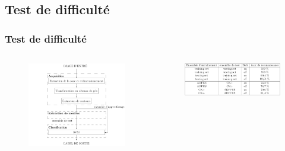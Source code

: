 \documentclass{beamer}
\begin{document}
\subsection{Test de difficulté}
\begin{frame}
  \frametitle{Test de difficulté}
    \begin{columns}
        \begin{figure}
        \includegraphics[scale=0.13]{image/test_exp.png}
        \end{figure}

        \begin{figure}
        \includegraphics[scale=0.15]{image/resultat_exp.png}
        \end{figure}
    \end{columns}
\end{frame}

\end{document}
